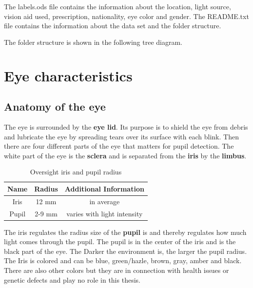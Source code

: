     The labels.ods file contains the information about the location, light source, vision aid used, prescription, nationality, eye color and gender. The README.txt file contains the information about the data set and the folder structure.
    
    The folder structure is shown in the following tree diagram.

    \section{Eye characteristics}
    \subsection{Anatomy of the eye}
    The eye is surrounded by the \textbf{eye lid}. Its purpose is to shield the eye from debris and lubricate the eye by spreading tears over its surface with each blink. Then there are four different parts of the eye that matters for pupil detection. The white part of the eye is the \textbf{sclera} and is separated from the \textbf{iris} by the \textbf{limbus}.
    \begin{table}[h]
      \centering 
      \begin{minipage}{0.7\textwidth}
        \centering
        \begin{tabular}{|c|c|c|}
          \hline
          Name & Radius & Additional Information \\
          \hline
          Iris & 12 mm & in average\\
          Pupil & 2-9 mm & varies with light intensity\\
          \hline
        \end{tabular}
        \caption{Oversight iris and pupil radius}
        \label{tab:eye_char}
      \end{minipage}\hfill
    \end{table}
 

    The iris regulates the radius size of the \textbf{pupil} is and thereby regulates how much light comes through the pupil. The pupil is in the center of the iris and is the black part of the eye. The Darker the environment is, the larger the pupil radius. The Iris is colored and can be blue, green/hazle, brown, gray, amber and black. There are also other colors but they are in connection with health issues or genetic defects and play no role in this thesis. 

